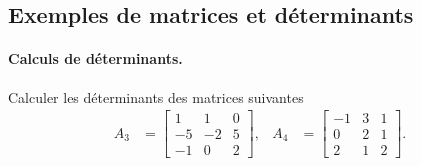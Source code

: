 \subsection{Exemples de matrices et déterminants}%

\paragraph{Calculs de déterminants.}
Calculer les déterminants des matrices suivantes 
\begin{align*}
  A_3 & = \left[\begin{array}{rrr}
    1 & 1 & 0 \\ -5 & -2 & 5 \\ -1 & 0 & 2
    \end{array}\right], &
  A_4 & = \left[\begin{array}{rrr}
    -1 & 3 & 1 \\ 0 & 2 & 1 \\ 2 & 1 & 2
    \end{array}\right].  
\end{align*}


